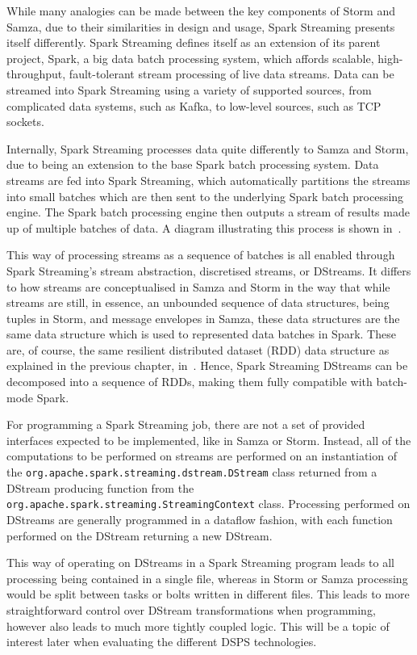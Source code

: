 While many analogies can be made between the key components of Storm and Samza, due to their similarities in design and
usage, Spark Streaming presents itself differently. Spark Streaming defines itself as an extension of its parent project,
Spark, a big data batch processing system, which affords scalable, high-throughput, fault-tolerant stream processing of
live data streams. Data can be streamed into Spark Streaming using a variety of supported sources, from complicated data
systems, such as Kafka, to low-level sources, such as TCP sockets.

Internally, Spark Streaming processes data quite differently to Samza and Storm, due to being an extension to the base
Spark batch processing system. Data streams are fed into Spark Streaming, which automatically partitions the streams into
small batches which are then sent to the underlying Spark batch processing engine. The Spark batch processing engine then
outputs a stream of results made up of multiple batches of data. A diagram illustrating this process is shown in~.

This way of processing streams as a sequence of batches is all enabled through Spark Streaming's stream abstraction,
discretised streams, or DStreams. It differs to how streams are conceptualised in Samza and Storm in the way that while
streams are still, in essence, an unbounded sequence of data structures, being tuples in Storm, and message envelopes in
Samza, these data structures are the same data structure which is used to represented data batches in Spark. These are,
of course, the same resilient distributed dataset (RDD) data structure as explained in the previous chapter, in~.
Hence, Spark Streaming DStreams can be decomposed into a sequence of RDDs, making them fully compatible with batch-mode Spark.

For programming a Spark Streaming job, there are not a set of provided interfaces expected to be implemented, like in
Samza or Storm. Instead, all of the computations to be performed on streams are performed on an instantiation of the
\texttt{org.apache.spark.streaming.dstream.DStream} class returned from a DStream producing function from the
\texttt{org.apache.spark.streaming.StreamingContext} class. Processing performed on DStreams are generally programmed in
a dataflow fashion, with each function performed on the DStream returning a new DStream.

This way of operating on DStreams in a Spark Streaming program leads to all processing being contained in a single file,
whereas in Storm or Samza processing would be split between tasks or bolts written in different files. This leads to
more straightforward control over DStream transformations when programming, however also leads to much more tightly
coupled logic. This will be a topic of interest later when evaluating the different DSPS technologies.

